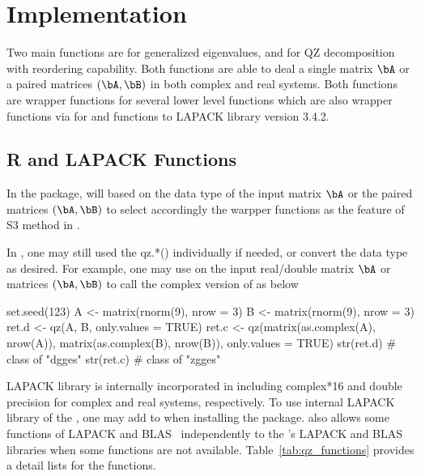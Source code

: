 

\section[Implementation]{Implementation}
\label{sec:implementation}

Two main functions are 
for generalized eigenvalues, and  for QZ decomposition with
reordering capability. Both functions are able to deal a single matrix $\bA$
or a paired matrices $(\bA,\bB)$ in both complex and real systems.
Both functions are wrapper functions for several lower level
 functions  which are also wrapper functions
via 
for  and  functions to LAPACK library 
version 3.4.2.


\subsection[R and LAPACK Functions]{R and LAPACK Functions}
\label{sec:lapack}

In the  package, 
will based on the data type of the input matrix $\bA$ or 
the paired matrices $(\bA,\bB)$ to select
accordingly the warpper functions 
as the feature of S3 method in .

In , one may still used the {qz.*()} individually if needed,
or convert the data type as desired. 
For example, one may use 
on the input real/double matrix $\bA$ or matrices $(\bA, \bB)$
to call the complex version of  as below
\begin{Code}[title=Use complex system via \code{as.complex()}]
set.seed(123)
A <- matrix(rnorm(9), nrow = 3)
B <- matrix(rnorm(9), nrow = 3)
ret.d <- qz(A, B, only.values = TRUE)
ret.c <- qz(matrix(as.complex(A), nrow(A)),
            matrix(as.complex(B), nrow(B)), only.values = TRUE)
str(ret.d)  # class of "dgges"
str(ret.c)  # class of "zgges"
\end{Code}

LAPACK library is internally incorporated in  including
complex*16 and double precision for complex and real systems, respectively.
To use internal LAPACK library of the ,
one may add 
to 
when installing the  package.
 also allows some functions of
LAPACK and BLAS~\citep{BLAS}
independently to the 's LAPACK and BLAS libraries
when some functions are not available.
Table~\ref{tab:qz_functions} provides a detail lists for the 
functions.

